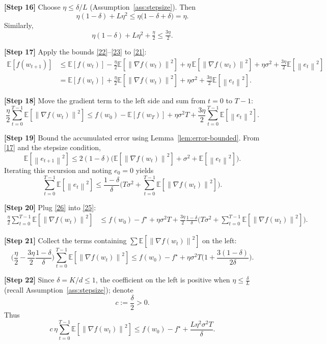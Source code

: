 \documentclass{article}
\newcommand{\E}{\mathbb{E}}
\newcommand{\norm}[1]{\left\lVert#1\right\rVert}
\begin{document}
\noindent\textbf{[Step 16]}  Choose $\eta\le\delta/L$ (Assumption~\ref{ass:stepsize}). Then
\[
\eta(1-\delta)+L\eta^2\le \eta\big(1-\delta+\delta\big)=\eta .
\tag{22}
\]
Similarly,
\[
\eta(1-\delta)+L\eta^2+\tfrac{\eta}{2}\le \tfrac{3\eta}{2}.
\tag{23}
\]

\noindent\textbf{[Step 17]}  Apply the bounds \eqref{22}–\eqref{23} to \eqref{21}:
\[
\begin{aligned}
\E[f(w_{t+1})]
&\le \E[f(w_t)]
-\frac{\eta}{2}\E[\norm{\nabla f(w_t)}^2]
+\eta\,\E[\norm{\nabla f(w_t)}^2]
+\eta\sigma^2
+\frac{3\eta}{2}\E[\norm{e_t}^2] \\
&= \E[f(w_t)]
+\frac{\eta}{2}\E[\norm{\nabla f(w_t)}^2]
+\eta\sigma^2
+\frac{3\eta}{2}\E[\norm{e_t}^2].
\end{aligned}
\tag{24}
\]

\noindent\textbf{[Step 18]}  Move the gradient term to the left side and sum from $t=0$ to $T-1$:
\[
\frac{\eta}{2}\sum_{t=0}^{T-1}\E[\norm{\nabla f(w_t)}^2]
\le f(w_0)-\E[f(w_T)]+ \eta\sigma^2 T
+\frac{3\eta}{2}\sum_{t=0}^{T-1}\E[\norm{e_t}^2].
\tag{25}
\]

\noindent\textbf{[Step 19]}  Bound the accumulated error using Lemma~\ref{lem:error-bounded}. From \eqref{17} and the stepsize condition,
\[
\E[\norm{e_{t+1}}^2]\le 2(1-\delta)\big(\E[\norm{\nabla f(w_t)}^2]+\sigma^2+\E[\norm{e_t}^2]\big).
\]
Iterating this recursion and noting $e_0=0$ yields
\[
\sum_{t=0}^{T-1}\E[\norm{e_t}^2]\le \frac{1-\delta}{\delta}\Big(T\sigma^2+ \sum_{t=0}^{T-1}\E[\norm{\nabla f(w_t)}^2]\Big).
\tag{26}
\]

\noindent\textbf{[Step 20]}  Plug \eqref{26} into \eqref{25}:
\[
\begin{aligned}
\frac{\eta}{2}\sum_{t=0}^{T-1}\E[\norm{\nabla f(w_t)}^2]
&\le f(w_0)-f^\star
+ \eta\sigma^2 T
+\frac{3\eta}{2}\frac{1-\delta}{\delta}
\Big(T\sigma^2+ \sum_{t=0}^{T-1}\E[\norm{\nabla f(w_t)}^2]\Big).
\end{aligned}
\tag{27}
\]

\noindent\textbf{[Step 21]}  Collect the terms containing $\sum \E[\norm{\nabla f(w_t)}^2]$ on the left:
\[
\Big(\frac{\eta}{2}-\frac{3\eta}{2}\frac{1-\delta}{\delta}\Big)
\sum_{t=0}^{T-1}\E[\norm{\nabla f(w_t)}^2]
\le f(w_0)-f^\star
+\eta\sigma^2 T\Big(1+\frac{3(1-\delta)}{2\delta}\Big).
\tag{28}
\]

\noindent\textbf{[Step 22]}  Since $\delta=K/d\le1$, the coefficient on the left is positive when $\eta\le\frac{\delta}{L}$ (recall Assumption~\ref{ass:stepsize}); denote
\[
c:=\frac{\delta}{2}>0.
\]
Thus
\[
c\,\eta\sum_{t=0}^{T-1}\E[\norm{\nabla f(w_t)}^2]
\le f(w_0)-f^\star + \frac{L\eta^2\sigma^2 T}{\delta}.
\tag{29}
\]
\end{document}
